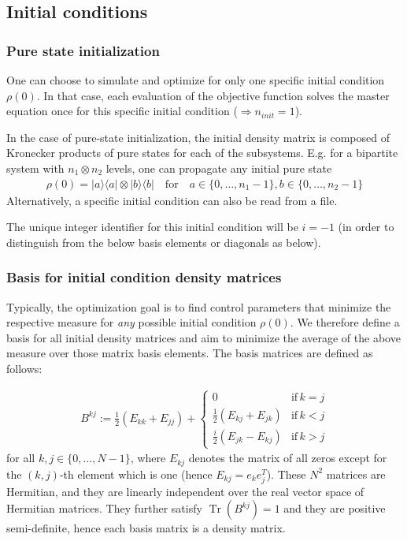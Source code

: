 \documentclass[11pt]{article}
\DeclareMathOperator{\Tr}{Tr}
\begin{document}
\subsection{Initial conditions}\label{subsec:initcond}

\subsubsection{Pure state initialization}
One can choose to simulate and optimize for only one specific initial condition $\rho(0)$. In that case, each evaluation of the objective function solves the master equation once for this specific initial condition ($\Rightarrow n_{init} = 1$). 

In the case of pure-state initialization, the initial density matrix is composed
of Kronecker products of pure states for each of the subsystems. E.g. for a bipartite system with $n_1
\otimes n_2$ levels, one can propagate any initial pure state 
\begin{align}
  \rho(0)  = |a\rangle \langle a| \otimes |b\rangle \langle b| \quad \text{for} \quad a \in \{0,\dots, n_1-1\}, b\in \{0,\dots, n_2-1\}
\end{align}
Alternatively, a specific initial condition can also be read from a file. 

The unique integer identifier for
this initial condition will be $i=-1$ (in order to distinguish from the below
basis elements or diagonals as below). 

\subsubsection{Basis for initial condition density matrices}
Typically, the optimization goal is to find control parameters that minimize the
respective measure for \textit{any} possible initial condition $\rho(0)$. We
therefore define a basis for all initial density matrices and aim to minimize
the average of the above measure over those matrix basis elements. The basis
matrices are defined as follows:

\begin{align}\label{eq:basismats}
B^{kj} := \frac 12 \left( E_{kk} + E_{jj}\right) +  \begin{cases} 
          0 & \text{if} \, k=j \\ 
        \frac 12 \left( E_{kj} + E_{jk}\right) & \text{if} \, k<j \\
        \frac i2 \left( E_{jk} - E_{kj}\right) & \text{if} \, k>j
      \end{cases} 
\end{align}
for all $k,j\in\{0,\dots, N-1\}$, where $E_{kj}$ denotes the matrix of all zeros
except for the $(k,j)$-th element which is one (hence $E_{kj} = e_ke_j^T$).
These $N^2$ matrices are Hermitian, and they are linearly independent over the
real vector space of Hermitian matrices. They further satisfy $\Tr(B^{kj}) = 1$
and they are positive semi-definite, hence each basis matrix is a density
matrix. 
\end{document}

